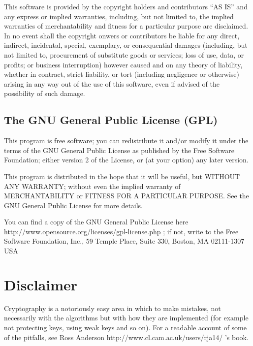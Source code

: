 \documentclass{article}
\begin{document}
\begin{sc}
This software is provided by the copyright holders and contributors ``AS IS'' 
and any express or implied warranties, including, but not limited to, 
the implied warranties of merchantability and fitness for a particular 
purpose are disclaimed. In no event shall the copyright onwers or
contributors be liable for any direct, indirect, incidental, special,
exemplary, or consequential damages (including, but not limited to,
procurement of substitute goods or services; loss of use, data, or profits;
or business interruption) however caused and on any theory of liability,
whether in contract, strict liability, or tort (including negligence or
otherwise) arising in any way out of the use of this software,
even if advised of the possibility of such damage.
\end{sc}

\subsection{The GNU General Public License (GPL)}

This program is free software; you can redistribute it and/or modify it under the terms of the GNU General Public License as published by the Free Software Foundation; either version 2 of the License, or (at your option) any later version.

This program is distributed in the hope that it will be useful, but WITHOUT ANY WARRANTY; without even the implied warranty of MERCHANTABILITY or FITNESS FOR A PARTICULAR PURPOSE. See the GNU General Public License for more details.

You can find a copy of
the GNU General Public License 
\htmladdnormallinkfoot
{here}
{http://www.opensource.org/licenses/gpl-license.php}
; 
if not, write to the Free Software Foundation, Inc., 59 Temple Place, 
Suite 330, Boston, MA 02111-1307 USA

\section{Disclaimer}
Cryptography is a notoriously easy area in which to make mistakes, 
not necessarily with the algorithms but with how they are implemented 
(for example not protecting keys, using weak keys and so on). 
For a readable account of some of the pitfalls, see 
\htmladdnormallinkfoot
{Ross Anderson}
{http://www.cl.cam.ac.uk/users/rja14/}
's book.
\end{document}
